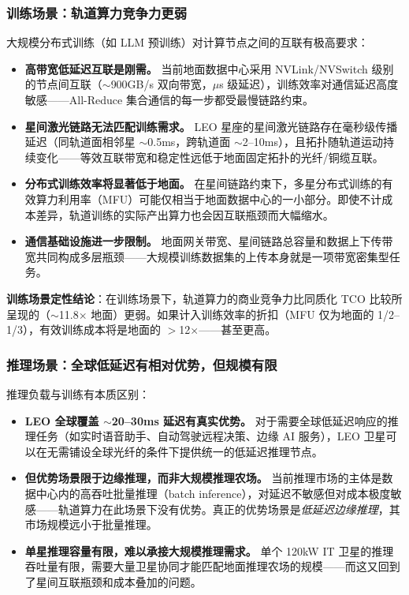 \subsubsection{训练场景：轨道算力竞争力更弱}

大规模分布式训练（如 LLM 预训练）对计算节点之间的互联有极高要求：
\begin{itemize}[leftmargin=*]
    \item \textbf{高带宽低延迟互联是刚需。} 当前地面数据中心采用 NVLink/NVSwitch 级别的节点间互联（$\sim$900\;GB/s 双向带宽，$\mu$s 级延迟），训练效率对通信延迟高度敏感——All-Reduce 集合通信的每一步都受最慢链路约束。
    \item \textbf{星间激光链路无法匹配训练需求。} LEO 星座的星间激光链路存在毫秒级传播延迟（同轨道面相邻星 $\sim$0.5\;ms，跨轨道面 $\sim$2--10\;ms），且拓扑随轨道运动持续变化——等效互联带宽和稳定性远低于地面固定拓扑的光纤/铜缆互联。
    \item \textbf{分布式训练效率将显著低于地面。} 在星间链路约束下，多星分布式训练的有效算力利用率（MFU）可能仅相当于地面数据中心的一小部分。即使不计成本差异，轨道训练的实际产出算力也会因互联瓶颈而大幅缩水。
    \item \textbf{通信基础设施进一步限制。} 地面网关带宽、星间链路总容量和数据上下传带宽共同构成多层瓶颈——大规模训练数据集的上传本身就是一项带宽密集型任务。
\end{itemize}

\textbf{训练场景定性结论}：在训练场景下，轨道算力的商业竞争力比同质化 TCO 比较所呈现的（$\sim$11.8$\times$ 地面）更弱。如果计入训练效率的折扣（MFU 仅为地面的 1/2--1/3），有效训练成本将是地面的 $>$12$\times$——甚至更高。

\subsubsection{推理场景：全球低延迟有相对优势，但规模有限}

推理负载与训练有本质区别：
\begin{itemize}[leftmargin=*]
    \item \textbf{LEO 全球覆盖 $\sim$20--30\;ms 延迟有真实优势。} 对于需要全球低延迟响应的推理任务（如实时语音助手、自动驾驶远程决策、边缘 AI 服务），LEO 卫星可以在无需铺设全球光纤的条件下提供统一的低延迟推理节点。
    \item \textbf{但优势场景限于边缘推理，而非大规模推理农场。} 当前推理市场的主体是数据中心内的高吞吐批量推理（batch inference），对延迟不敏感但对成本极度敏感——轨道算力在此场景下没有优势。真正的优势场景是\emph{低延迟边缘推理}，其市场规模远小于批量推理。
    \item \textbf{单星推理容量有限，难以承接大规模推理需求。} 单个 120\;kW IT 卫星的推理吞吐量有限，需要大量卫星协同才能匹配地面推理农场的规模——而这又回到了星间互联瓶颈和成本叠加的问题。
\end{itemize}

